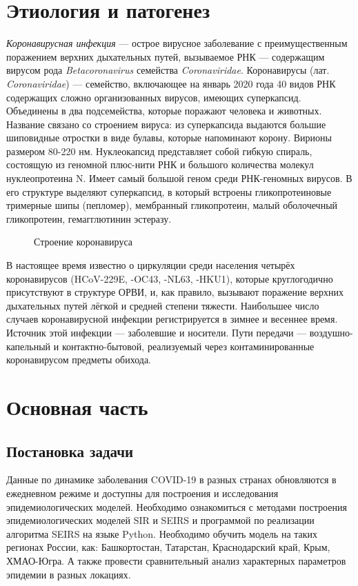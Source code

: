\documentclass{article}
\begin{document}
\section*{Этиология и патогенез}
\noindent \textit{Коронавирусная инфекция} — острое вирусное заболевание с преимущественным поражением верхних дыхательных путей, вызываемое РНК — содержащим вирусом рода \textit{Betacoronavirus} семейства \textit{Coronaviridae}. Коронавирусы (лат. \textit{Coronaviridae}) — семейство, включающее на январь 2020 года 40 видов РНК содержащих сложно организованных вирусов, имеющих суперкапсид. Объединены в два подсемейства, которые поражают человека и животных. Название связано со строением вируса: из суперкапсида выдаются большие шиповидные отростки в виде булавы, которые напоминают корону. Вирионы размером 80-220 нм. Нуклеокапсид представляет собой гибкую спираль, состоящую из геномной плюс-нити РНК и большого количества молекул нуклеопротеина N. Имеет самый большой геном среди РНК-геномных вирусов. В его структуре выделяют суперкапсид, в который встроены гликопротеиновые тримерные шипы (пепломер), мембранный гликопротеин, малый оболочечный гликопротеин, гемагглютинин эстеразу.
\begin{figure}[H]
	\caption{Строение коронавируса}
	\label{fig:image}
\end{figure}

\noindent В настоящее время известно о циркуляции среди населения четырёх коронавирусов (HCoV-229E, -OC43, -NL63, -HKU1), которые круглогодично присутствуют в структуре ОРВИ, и, как правило, вызывают поражение верхних дыхательных путей лёгкой и средней степени тяжести. Наибольшее число случаев коронавирусной инфекции регистрируется в зимнее и весеннее время. Источник этой инфекции — заболевшие и носители. Пути передачи — воздушно-капельный и контактно-бытовой, реализуемый через контаминированные коронавирусом предметы обихода.

\section{Основная часть}
\subsection{Постановка задачи}
\noindent Данные по динамике заболевания COVID-19 в разных странах обновляются в ежедневном режиме и доступны для построения и исследования эпидемиологических моделей. Необходимо ознакомиться с методами построения эпидемиологических моделей SIR и SEIRS и программой по реализации алгоритма SEIRS на языке Python. Необходимо обучить модель на таких регионах России, как: Башкортостан, Татарстан, Краснодарский край, Крым, ХМАО-Югра. А также провести сравнительный анализ характерных параметров эпидемии в разных локациях.
\end{document}
